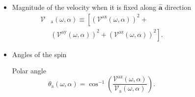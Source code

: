 \documentclass{beamer}
\begin{document}
\begin{frame}
{\begin{columns}
\begin{figure}[h!]
\end{figure}


\begin{itemize}

\item Magnitude of the velocity when it is fixed along $\mathbf{\hat{a}}$
direction
\vspace{-2mm}
\begin{align}
\mathcal{V}&_{\mathrm{a}}(\omega,\alpha) \equiv 
\left[
\left(\mathcal{V}^{\mathrm{ax}}(\omega,\alpha)\right)^{2} +
\right. \nonumber  \\ & \left.
\left(\mathcal{V}^{\mathrm{ay}}(\omega,\alpha)\right)^{2} +
\left(\mathcal{V}^{\mathrm{az}}(\omega,\alpha)\right)^{2} \right]
.
\label{eq:vv-mag}
\end{align}

\vspace{-5mm}

\item 
Angles of the spin

Polar angle
\vspace{-3mm}
\begin{equation}
\theta_{\mathrm{a}}  (\omega,\alpha) = 
\cos^{-1} \left( \frac{\mathcal{V}^{\mathrm{az}}(\omega,\alpha)}
{\mathcal{V}_{\mathrm{a}}(\omega,\alpha)} \right).
\label{eq:polar-ang}
\end{equation}


\end{itemize}
\end{columns}}
\end{frame}
\end{document}
